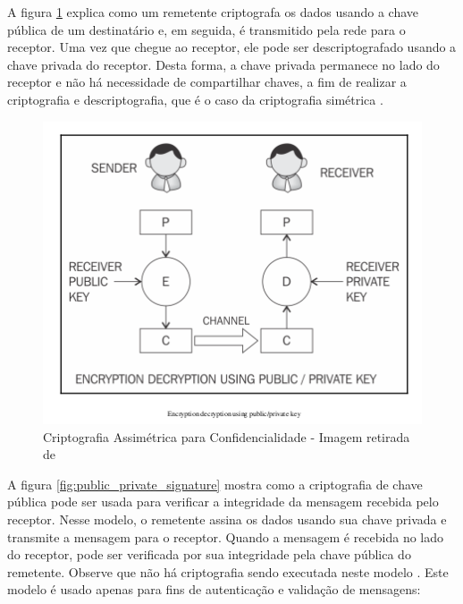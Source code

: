                 A figura \ref{fig:public_private_encryption} explica como um remetente criptografa os dados usando a chave pública de um destinatário e, em seguida, é transmitido pela rede para o receptor. Uma vez que chegue ao receptor, ele pode ser descriptografado usando a chave privada do receptor. Desta forma, a chave privada permanece no lado do receptor e não há necessidade de compartilhar chaves, a fim de realizar a criptografia e descriptografia, que é o caso da criptografia simétrica \cite{mastering_blockchain}.

                    \begin{figure}[H]
                         \centering
                         \includegraphics[scale=0.6]{figuras/capitulo_2/public_private_encryption.png}
                         \caption{Criptografia Assimétrica para Confidencialidade - Imagem retirada de \cite{mastering_blockchain}}
                         \label{fig:public_private_encryption}
                    \end{figure}
                    
                    
                A figura \ref{fig:public_private_signature} mostra como a criptografia de chave pública pode ser usada para verificar a integridade da mensagem recebida pelo receptor. Nesse modelo, o remetente assina os dados usando sua chave privada e transmite a mensagem para o receptor. Quando a mensagem é recebida no lado do receptor, pode ser verificada por sua integridade pela chave pública do remetente. Observe que não há criptografia sendo executada neste modelo \cite{mastering_blockchain}. Este modelo é usado apenas para fins de autenticação e validação de mensagens:
                    
